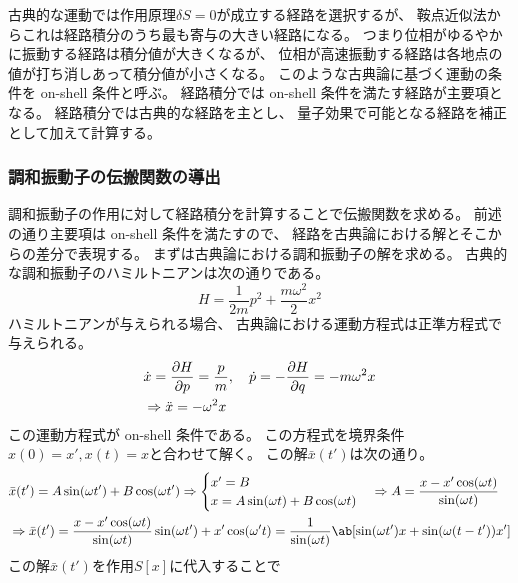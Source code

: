 古典的な運動では作用原理$\delta S=0$が成立する経路を選択するが、
鞍点近似法からこれは経路積分のうち最も寄与の大きい経路になる。
つまり位相がゆるやかに振動する経路は積分値が大きくなるが、
位相が高速振動する経路は各地点の値が打ち消しあって積分値が小さくなる。
このような古典論に基づく運動の条件を on-shell 条件と呼ぶ。
経路積分では on-shell 条件を満たす経路が主要項となる。
経路積分では古典的な経路を主とし、
量子効果で可能となる経路を補正として加えて計算する。

\subsubsection{調和振動子の伝搬関数の導出}

調和振動子の作用に対して経路積分を計算することで伝搬関数を求める。
前述の通り主要項は on-shell 条件を満たすので、
経路を古典論における解とそこからの差分で表現する。
まずは古典論における調和振動子の解を求める。
古典的な調和振動子のハミルトニアンは次の通りである。
\begin{equation}
  H=\frac{1}{2m}p^2+\frac{m\omega^2}{2}x^2
\end{equation}
ハミルトニアンが与えられる場合、
古典論における運動方程式は正準方程式で与えられる。
\begin{equation}
  \begin{split}
    &\dot{x}=\pdv{H}{p}=\frac{p}{m},\quad
    \dot{p}=-\pdv{H}{q}=-m\omega^2 x \\
    &\Rightarrow
    \ddot{x}=-\omega^2 x
  \end{split}
\end{equation}
この運動方程式が on-shell 条件である。
この方程式を境界条件$x(0)=x',x(t)=x$と合わせて解く。
この解$\bar{x}(t')$は次の通り。
\begin{equation}
  \begin{split}
    &\bar{x}(t')=A\sin(\omega t')+B\cos(\omega t')
    \Rightarrow
    \begin{cases}
      x'=B \\
      x=A\sin(\omega t)+B\cos(\omega t)
    \end{cases}
    \Rightarrow
    A=\frac{x-x'\cos(\omega t)}{\sin(\omega t)} \\
    &\Rightarrow
    \bar{x}(t')=\frac{x-x'\cos(\omega t)}{\sin(\omega t)}\sin(\omega t')+x'\cos(\omega' t)
    =\frac{1}{\sin(\omega t)}\ab[
      \sin(\omega t')x+\sin(\omega(t-t'))x'
    ]
  \end{split}
\end{equation}
この解$\bar{x}(t')$を作用$S[x]$に代入することで
